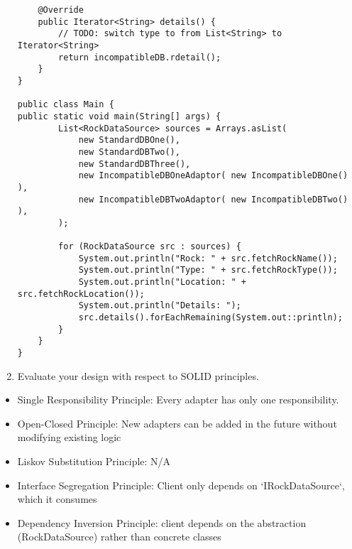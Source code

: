 \begin{enumerate}
\begin{verbatim}
    @Override
    public Iterator<String> details() { 
        // TODO: switch type to from List<String> to Iterator<String>
        return incompatibleDB.rdetail(); 
    }
}

public class Main {
public static void main(String[] args) {
        List<RockDataSource> sources = Arrays.asList(
            new StandardDBOne(),
            new StandardDBTwo(),
            new StandardDBThree(),
            new IncompatibleDBOneAdaptor( new IncompatibleDBOne() ),
            new IncompatibleDBTwoAdaptor( new IncompatibleDBTwo() ),
        );

        for (RockDataSource src : sources) {
            System.out.println("Rock: " + src.fetchRockName());
            System.out.println("Type: " + src.fetchRockType());
            System.out.println("Location: " + src.fetchRockLocation());
            System.out.println("Details: ");
            src.details().forEachRemaining(System.out::println);
        }
    }
}
\end{verbatim}


    \item Evaluate your design with respect to SOLID principles. 
\end{enumerate}

\begin{itemize}
    \item Single Responsibility Principle: Every adapter has only one responsibility.
    \item Open-Closed Principle: New adapters can be added in the future without modifying existing logic
    \item Liskov Substitution Principle: N/A
    \item Interface Segregation Principle: Client only depends on `IRockDataSource`, which it consumes
    \item Dependency Inversion Principle: client depends on the abstraction (RockDataSource) rather than concrete classes
\end{itemize}






